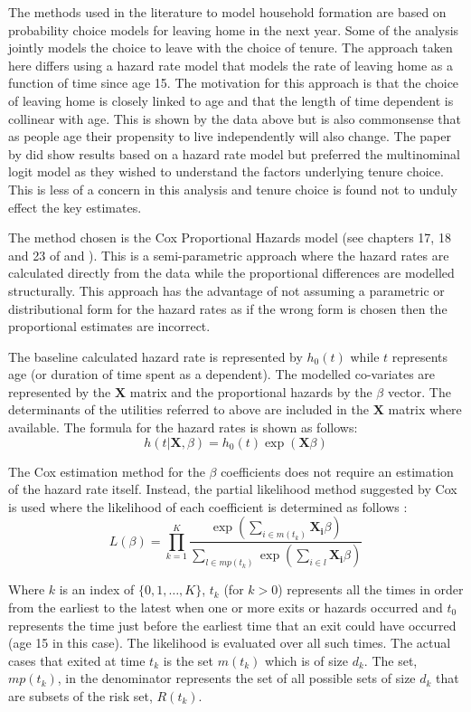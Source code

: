 \documentclass[12pt]{article}
\begin{document}
The methods used in the literature to model household formation are based on probability choice models for leaving home in the next year. Some of the analysis jointly models the choice to leave with the choice of tenure. The approach taken here differs using a hazard rate model that models the rate of leaving home as a function of time since age 15. The motivation for this approach is that the choice of leaving home is closely linked to age and that the length of time dependent is collinear with age. This is shown by the data above but is also commonsense that as people age their propensity to live independently will also change. The paper by \cite{lee2013happens} did show results based on a hazard rate model but preferred the multinominal logit model as they wished to understand the factors underlying tenure choice. This is less of a concern in this analysis and tenure choice is found not to unduly effect the key estimates.

The method chosen is the Cox Proportional Hazards model (see chapters 17, 18 and 23 of \cite{cameron2005microeconometrics} and \cite{brostrom2012event}). This is a semi-parametric approach where the hazard rates are calculated directly from the data while the proportional differences are modelled structurally. This approach has the advantage of not assuming a parametric or distributional form for the hazard rates as if the wrong form is chosen then the proportional estimates are incorrect.

The baseline calculated hazard rate is represented by $h_0(t)$ while $t$ represents age (or  duration of time spent as a dependent). The modelled co-variates are represented by the $\mathbf{X}$ matrix and the proportional hazards by the $\beta$ vector. The determinants of the utilities referred to above are included in the $\mathbf{X}$ matrix where available. The formula for the hazard rates is shown as follows:
\[h(t|\mathbf{X}, \beta) = h_0( t ) \exp ( \mathbf{X}  \beta )\]

The Cox estimation method for the $\beta$ coefficients does not require an estimation of the hazard rate itself. Instead, the partial likelihood method suggested by Cox is used where the likelihood of each coefficient is determined as follows \parencite{cox1972regression}:
\[ L(\beta) = \prod_{k = 1}^{K} \frac{\exp ( \sum_{i \in m(t_k)}\mathbf{ X_i}  \beta )}{\sum_{l \in mp(t_k)}\exp ( \sum_{i \in l}\mathbf{X_i}  \beta ) }  \]

Where $k$ is an index of $\{0, 1, \dots, K\}$, $t_k$ (for $k>0$) represents all the times in order from the earliest to the latest when one or more exits or hazards occurred and $t_0$ represents the time just before the earliest time that an exit could have occurred (age 15 in this case). The likelihood is evaluated over all such times. The actual cases that exited at time $t_k$ is the set $m(t_k)$ which is of size $d_k$. The set, $mp(t_k)$, in the denominator represents the set of all possible sets of size $d_k$ that are subsets of the risk set, $R(t_k)$.
\end{document}
